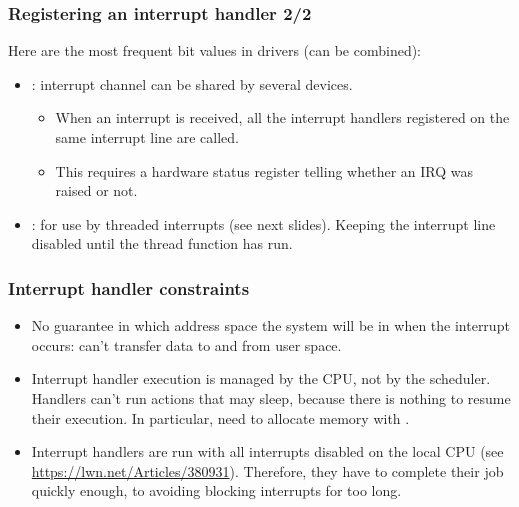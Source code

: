 \begin{frame}
  \frametitle{Registering an interrupt handler 2/2}
  Here are the most frequent  bit values
  in drivers (can be combined):
  \begin{itemize}
     \item {}: interrupt channel can be shared by several devices.
     \begin{itemize}
	\item When an interrupt is received, all the interrupt
	handlers registered on the same interrupt line are called.
	\item This requires a hardware status register telling whether
        an IRQ was raised or not.
     \end{itemize}
     \item {}: for use by threaded interrupts (see
     next slides). Keeping the interrupt line disabled until the thread
     function has run.
  \end{itemize}
\end{frame}

\begin{frame}
  \frametitle{Interrupt handler constraints}
  \begin{itemize}
  \item No guarantee in which address space the system will be in when
    the interrupt occurs: can't transfer data to and from user space.
  \item Interrupt handler execution is managed by the CPU, not by the
    scheduler.  Handlers can't run actions that may sleep, because
    there is nothing to resume their execution. In particular, need to
    allocate memory with .
  \item Interrupt handlers are run with all interrupts disabled on
    the local CPU (see \url{https://lwn.net/Articles/380931}).
    Therefore, they have to complete their job quickly
    enough, to avoiding blocking interrupts for too long.
  \end{itemize}
\end{frame}

